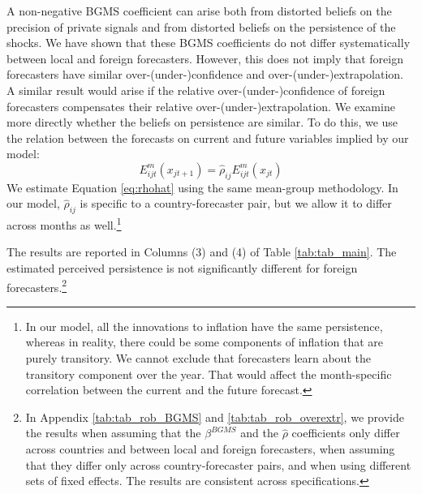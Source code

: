 A non-negative BGMS coefficient can arise both from distorted beliefs on the precision of private signals and from distorted beliefs on the persistence of the shocks. We have shown that these BGMS coefficients do not differ systematically between local and foreign forecasters. However, this does not imply that foreign forecasters have similar over-(under-)confidence and over-(under-)extrapolation. A similar result would arise if the relative over-(under-)confidence of foreign forecasters compensates their relative over-(under-)extrapolation.  We examine more directly whether the beliefs on persistence are similar. To do this, we use the relation between the forecasts on current and future variables implied by our model:
\begin{equation}E_{ijt}^m(x_{jt+1})=\hat\rho_{ij}E_{ijt}^m(x_{jt})\label{eq:rhohat}
\end{equation}
We estimate Equation \eqref{eq:rhohat} using the same mean-group methodology. In our model, $\hat\rho_{ij}$ is specific to a country-forecaster pair, but we allow it to differ across months as well.\footnote{In our model, all the innovations to inflation have the same persistence, whereas in reality, there could be some components of inflation that are purely transitory. We cannot exclude that forecasters learn about the transitory component over the year. That would affect the month-specific correlation between the current and the future forecast.}

The results are reported in Columns (3) and (4) of Table \ref{tab:tab_main}. The estimated perceived persistence is not significantly different for foreign forecasters.\footnote{In Appendix \ref{tab:tab_rob_BGMS} and \ref{tab:tab_rob_overextr}, we provide the results when assuming that the $\beta^{BGMS}$ and the $\hat\rho$ coefficients only differ across countries and between local and foreign forecasters, when assuming that they differ only across country-forecaster pairs, and when using different sets of fixed effects. The results are consistent across specifications.}

